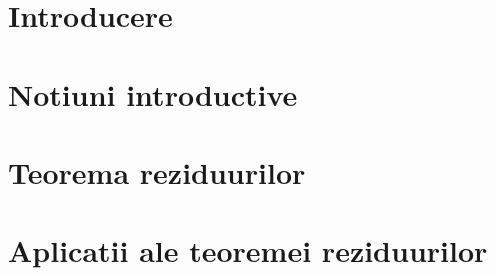 \documentclass[12pt,a4paper]{article}
\begin{document}


\tableofcontents

\clearpage
\section{Introducere}


\clearpage
\section{Notiuni introductive}


\clearpage
\section{Teorema reziduurilor}


\clearpage
\section{Aplicatii ale teoremei reziduurilor}




\clearpage
\nocite{*}


\end{document}
